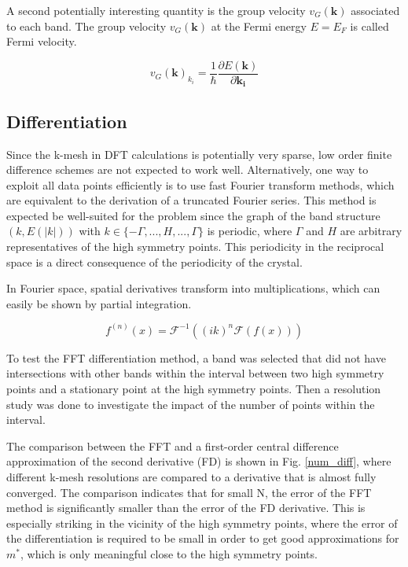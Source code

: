 

A second potentially interesting quantity is the group velocity $v_{G}(\mathbf{k})$ associated to each band. The group velocity $v_{G}(\mathbf{k})$ at the Fermi energy $E = E_F$ is called Fermi velocity.

\begin{equation}
    v_{G}(\mathbf{k})_{k_i} = \frac{1}{\hbar}\frac{\partial E(\mathbf{k})}{\partial \mathbf{k_i}}
\end{equation}


\subsection{Differentiation}

Since the k-mesh in DFT calculations is potentially very sparse, low order finite difference schemes are not expected to work well. Alternatively, one way to exploit all data points efficiently is to use fast Fourier transform methods, which are equivalent to the derivation of a truncated Fourier series. This method is expected be well-suited for the problem since the graph of the band structure $(k, E(|k|))$ with $k \in \{-\Gamma,..., H,..., \Gamma\}$ is periodic, where $\Gamma$ and $H$ are arbitrary representatives of the high symmetry points. This periodicity in the reciprocal space is a direct consequence of the periodicity of the crystal.

In Fourier space, spatial derivatives transform into multiplications, which can easily be shown by partial integration.

\begin{equation}
    f^{(n)}(x) = \mathcal{F}^{-1}\left((ik)^n\mathcal{F}(f(x))\right)
\end{equation}
 
To test the FFT differentiation method, a band was selected that did not have intersections with other bands within the interval between two high symmetry points and a stationary point at the high symmetry points. Then a resolution study was done to investigate the impact of the number of points within the interval.

The comparison between the FFT and a first-order central difference approximation of the second derivative (FD) is shown in Fig. \ref{num_diff}, where different k-mesh resolutions are compared to a derivative that is almost fully converged. The comparison indicates that for small N, the error of the FFT method is significantly smaller than the error of the FD derivative. This is especially striking in the vicinity of the high symmetry points, where the error of the differentiation is required to be small in order to get good approximations for $m^{*}$, which is only meaningful close to the high symmetry points.


